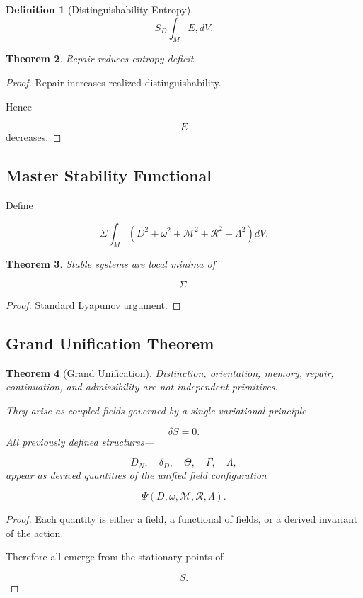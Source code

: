 \documentclass[12pt]{article}
\newtheorem{theorem}{Theorem}[section]
\newtheorem{definition}[theorem]{Definition}
\theoremstyle{remark}
\begin{document}
\begin{definition}[Distinguishability Entropy]
\[
S_D
\int_M
E
,dV.
\]
\end{definition}

\begin{theorem}
Repair reduces entropy deficit.
\end{theorem}

\begin{proof}
Repair increases realized distinguishability.

Hence

\[
E
\]
decreases.
\end{proof}

\subsection{Master Stability Functional}

Define

\[
\Sigma
\int_M
\left(
D^2
+
\omega^2
+
\mathcal M^2
+
\mathcal R^2
+
\Lambda^2
\right)
dV.
\]

\begin{theorem}
Stable systems are local minima of

\[
\Sigma.
\]
\end{theorem}
\begin{proof}
Standard Lyapunov argument.
\end{proof}

\subsection{Grand Unification Theorem}

\begin{theorem}[Grand Unification]
Distinction, orientation, memory, repair, continuation, and admissibility are not independent primitives.

They arise as coupled fields governed by a single variational principle

\[
\delta S=0.
\]
All previously defined structures—

\[
D_N,
\quad
\delta_D,
\quad
\Theta,
\quad
\Gamma,
\quad
\Lambda,
\]
appear as derived quantities of the unified field configuration

\[
\Psi
(D,\omega,\mathcal M,\mathcal R,\Lambda).
\]
\end{theorem}

\begin{proof}
Each quantity is either a field, a functional of fields, or a derived invariant of the action.

Therefore all emerge from the stationary points of

\[
S.
\]
\end{proof}
\end{document}
